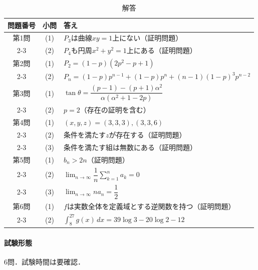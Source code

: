 \documentclass[../../main.tex]{subfiles}
\begin{document}
\begin{table}[htb]
  \centering
  \caption{解答}
  \renewcommand{\arraystretch}{1.4}
  \begin{tabular}{|c|c|p{9cm}|}
    \hline
    \textbf{問題番号} & \textbf{小問} & \textbf{答え} \\
    \hline
    第1問 & (1) & $P_3$は曲線$xy=1$上にない（証明問題） \\
    \cline{2-3}
    & (2) & $P_4$も円周$x^2+y^2=1$上にある（証明問題） \\
    \hline
    第2問 & (1) & $P_2=(1-p)(2p^2-p+1)$ \\
    \cline{2-3}
    & (2) & $P_n=(1-p)p^{n-1}+(1-p)p^n
    +(n-1)(1-p)^3p^{n-2}$ \\
    \hline
    第3問 & (1) & $\tan\theta=
    \dfrac{(p-1)-(p+1)\alpha^2}{\alpha(\alpha^2+1-2p)}$ \\
    \cline{2-3}
    & (2) & $p=2$（存在の証明を含む） \\
    \hline
    第4問 & (1) & $(x,y,z)=(3,3,3),(3,3,6)$ \\
    \cline{2-3}
    & (2) & 条件を満たす$z$が存在する（証明問題） \\
    \cline{2-3}
    & (3) & 条件を満たす組は無数にある（証明問題） \\
    \hline
    第5問 & (1) & $b_n>2n$（証明問題） \\
    \cline{2-3}
    & (2) & $\displaystyle\lim_{n\to\infty}
    \dfrac{1}{n}\sum_{k=1}^{n}a_k=0$ \\
    \cline{2-3}
    & (3) & $\displaystyle\lim_{n\to\infty}na_n=\dfrac{1}{2}$ \\
    \hline
    第6問 & (1) & $f$は実数全体を定義域とする逆関数を持つ（証明問題） \\
    \cline{2-3}
    & (2) & $\displaystyle\int_8^{27}g(x)\,dx
    =39\log3-20\log2-12$ \\
    \hline
  \end{tabular}
\end{table}

\paragraph{試験形態}
6問．試験時間は要確認．
\end{document}

